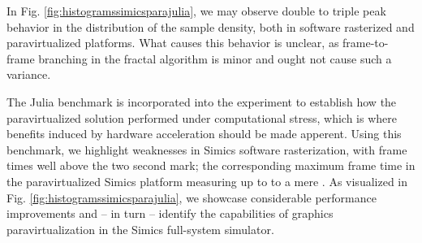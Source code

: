 In Fig. \ref{fig:histogramssimicsparajulia}, we may observe double to triple peak behavior in the distribution of the sample density, both in software rasterized and paravirtualized platforms.
What causes this behavior is unclear, as frame-to-frame branching in the fractal algorithm is minor and ought not cause such a variance.

The Julia benchmark is incorporated into the experiment to establish how the paravirtualized solution performed under computational stress, which is where benefits induced by hardware acceleration should be made apperent.
Using this benchmark, we highlight weaknesses in Simics software rasterization, with frame times well above the two second mark; the corresponding maximum frame time in the paravirtualized Simics platform measuring up to to a mere  \milli\second .
As visualized in Fig. \ref{fig:histogramssimicsparajulia}, we showcase considerable performance improvements and -- in turn -- identify the capabilities of graphics paravirtualization in the Simics full-system simulator.


